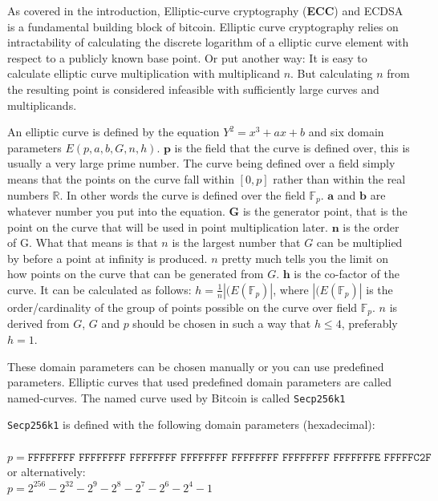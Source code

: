 
\label{ecdsa}
As covered in the introduction, Elliptic-curve cryptography (\textbf{ECC}) and ECDSA is a fundamental building block of bitcoin. Elliptic curve cryptography relies on intractability of calculating the discrete logarithm of a elliptic curve element with respect to a publicly known base point. Or put another way: It is easy to calculate elliptic curve multiplication with multiplicand $n$. But calculating $n$ from the resulting point is considered infeasible with sufficiently large curves and multiplicands.

An elliptic curve is defined by the equation $Y^2=x^3+ax+b$ and six domain parameters $E(p,a,b,G,n,h)$. $\textbf{p}$ is the field that the curve is defined over, this is usually a very large prime number. The curve being defined over a field simply means that the points on the curve fall within $[0, p]$ rather than within the real numbers $\mathbb{R}$. In other words the curve is defined over the field $\mathbb{F}_{p}$. $\textbf{a}$ and $\textbf{b}$ are whatever number you put into the equation. $\textbf{G}$ is the generator point, that is the point on the curve that will be used in point multiplication later. $\textbf{n}$ is the order of G. What that means is that $n$ is the largest number that $G$ can be multiplied by before a point at infinity is produced. $n$ pretty much tells you the limit on how points on the curve that can be generated from $G$. $\textbf{h}$ is the co-factor of the curve. It can be calculated as follows: $h=\frac{1}{n}|(E(\mathbb{F}_{p})|$, where $|(E(\mathbb{F}_{p})|$ is the order/cardinality of the group of points possible on the curve over field $\mathbb{F}_{p}$. $n$ is derived from $G$, $G$ and $p$ should be chosen in such a way that $h \leq 4$, preferably $h=1$.

These domain parameters can be chosen manually or you can use predefined parameters. Elliptic curves that used predefined domain parameters are called named-curves. The named curve used by Bitcoin is called \texttt{Secp256k1}

\texttt{Secp256k1} is defined with the following domain parameters (hexadecimal):\\\\
$p=\texttt{FFFFFFFF FFFFFFFF FFFFFFFF FFFFFFFF FFFFFFFF FFFFFFFF FFFFFFFE FFFFFC2F}$\\
or alternatively:\\
$p=2^{256}-2^{32}-2^{9}-2^{8}-2^{7}-2^{6}-2^{4}-1$

